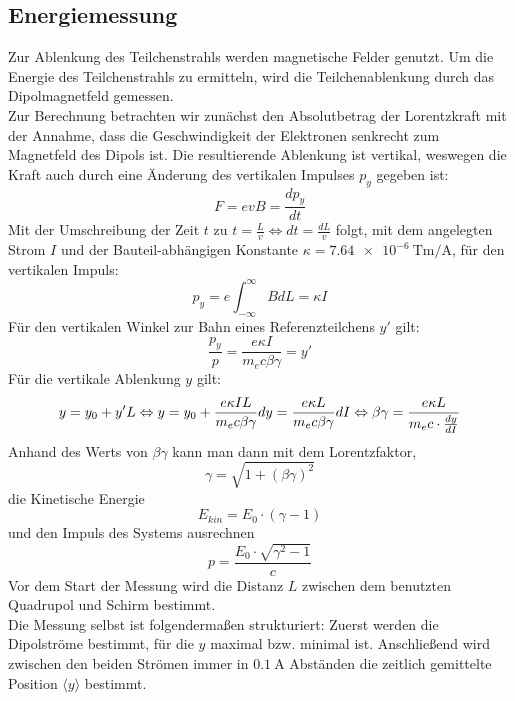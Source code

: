 \documentclass[10pt,a4paper, bibliography=totoc]{scrartcl}
\begin{document}
\subsection{Energiemessung}
Zur Ablenkung des Teilchenstrahls werden magnetische Felder genutzt. Um die Energie des Teilchenstrahls zu ermitteln, wird die Teilchenablenkung durch das Dipolmagnetfeld gemessen.\\
Zur Berechnung betrachten wir zunächst den Absolutbetrag der Lorentzkraft mit der Annahme, dass die Geschwindigkeit der Elektronen senkrecht zum Magnetfeld des Dipols ist. Die resultierende Ablenkung ist vertikal, weswegen die Kraft auch durch eine Änderung des vertikalen Impulses $p_y$ gegeben ist:
\begin{equation}
	F=evB=\frac{dp_y}{dt}
\end{equation}
Mit der Umschreibung der Zeit $t$ zu $t=\frac{L}{v} \Leftrightarrow dt=\frac{dL}{v}$ folgt, mit dem angelegten Strom $I$ und der Bauteil-abhängigen Konstante $\kappa = \qty{7.64e-6}{\tesla\meter\per\ampere}$, für den vertikalen Impuls:
\begin{equation}
	p_y = e\int^{\infty}_{-\infty}BdL = \kappa I
\end{equation}
Für den vertikalen Winkel zur Bahn eines Referenzteilchens $y'$ gilt:
\begin{equation}
	\frac{p_y}{p}=\frac{e\kappa I}{m_ec\beta\gamma}=y'
\end{equation}
Für die vertikale Ablenkung $y$ gilt:
\begin{equation}
	y=y_0+y'L \Leftrightarrow y=y_0+\frac{e\kappa IL}{m_ec\beta\gamma}\\
	dy = \frac{e\kappa L}{m_ec\beta\gamma}dI \Leftrightarrow \beta\gamma = \frac{e\kappa L}{m_ec\cdot \frac{dy}{dI}}
    \label{eq:herleitungbetagamma}
\end{equation}
Anhand des Werts von $\beta\gamma$ kann man dann mit dem Lorentzfaktor,
\begin{equation}
    \gamma = \sqrt{1+(\beta\gamma)^2}
    \label{eq:gamma}
\end{equation}
die Kinetische Energie
\begin{equation}
    E_{kin} = E_0\cdot(\gamma-1)
    \label{eq:ekin}
\end{equation}
und den Impuls des Systems ausrechnen
\begin{equation}
    p = \frac{E_0\cdot \sqrt{\gamma^2-1}}{c}
    \label{eq:p}
\end{equation}
Vor dem Start der Messung wird die Distanz $L$ zwischen dem benutzten Quadrupol und Schirm bestimmt.\\
Die Messung selbst ist folgendermaßen strukturiert: Zuerst werden die Dipolströme bestimmt, für die $y$ maximal bzw. minimal ist. Anschließend wird zwischen den beiden Strömen immer in $\qty{0,1}{\ampere}$ Abständen die zeitlich gemittelte Position $\langle y\rangle$ bestimmt. 
\end{document}
